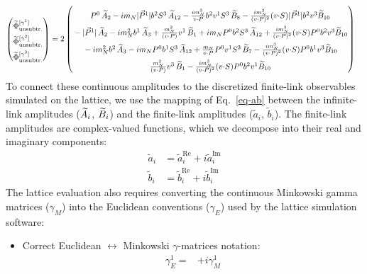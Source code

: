 \begin{widetext}
\begin{align}
\begin{pmatrix}
        \rule{0pt}{16pt} \widetilde \Phi^{[\gamma^{1}]}_{\unsub}\\
        \rule{0pt}{16pt} \widetilde \Phi^{[\gamma^{2}]}_{\unsub}\\
        \rule{0pt}{16pt} \widetilde \Phi^{[\gamma^{3}]}_{\unsub}
    \end{pmatrix} &=2\begin{pmatrix}
       \rule{0pt}{16pt}  P^0\, \tAmp_2  - i \mN  |\vec{P}^1| \bvec^2 S^3\, \tAmp_{12}- \frac{ i \mN^3}{v \tcdot P}  \bvec^2 v^1 S^3\, \tBmp_8- \frac{i \mN^3}{(v \tcdot P)^2} (v \tcdot S)  |\vec{P}^1| \bvec^2 v^3 \tBmp_{10}\\
        \rule{0pt}{16pt} -|\vec{P}^1|\, \tAmp_2- i \mN^2 \bvec^1\, \tAmp_3+ \frac{\mN^2}{(v \tcdot P)} v^1\, \tBmp_1 
		+ i \mN  P^0 \bvec^2 S^3\, \tAmp_{12}+ \frac{i \mN^3}{(v \tcdot P)^2} (v \tcdot S)  P^0 \bvec^2 v^3 \tBmp_{10}\\
         \rule{0pt}{16pt} - i \mN^2 \bvec^2\, \tAmp_3
		- i \mN  P^0 \bvec^1 S^3\, \tAmp_{12}+ \frac{\mN}{v \tcdot P}  P^0 v^1 S^3\, \tBmp_7- \frac{i \mN^3}{(v \tcdot P)^2} (v \tcdot S) P^0 \bvec^1 v^3 \tBmp_{10}\\
        \rule{0pt}{16pt} \frac{\mN^2}{(v \tcdot P)} v^3\, \tBmp_1- \frac{i \mN^3}{(v \tcdot P)^2} (v \tcdot S)  P^0 \bvec^2 v^1 \tBmp_{10}
    \end{pmatrix}
\end{align}
To connect these continuous amplitudes to the discretized finite-link observables simulated on the lattice, we use the mapping of Eq.~\eqref{eq-ab} between the infinite-link amplitudes ($\widetilde{A}_i$, $\widetilde{B}_i$) and the finite-link amplitudes ($\tilde{a}_i$, $\tilde{b}_i$). The finite-link amplitudes are complex-valued functions, which we decompose into their real and imaginary components:
\begin{align}
    \tilde{a}_i&=\tilde{a}^{\text{Re}}_i+i\tilde{a}^{\text{Im}}_i\\
    \tilde{b}_i&=\tilde{b}^{\text{Re}}_i+i\tilde{b}^{\text{Im}}_i
\end{align}
The lattice evaluation also requires converting the continuous Minkowski gamma matrices ($\gamma_M$) into the Euclidean conventions ($\gamma_E$) used by the lattice simulation software:
\begin{itemize}
    \item Correct Euclidean $\longleftrightarrow$ Minkowski $\gamma$-matrices notation:
    \begin{align}
        \gamma^{1}_{E}=&+i\gamma^{1}_{M}\\

\end{align}
\end{itemize}
\end{widetext}
